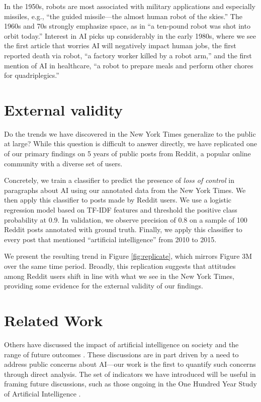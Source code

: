 \documentclass[letterpaper]{article}
\begin{document}
In the 1950s, robots are most associated with military applications and especially missiles, e.g., ``the guided missile---the almost human robot of the skies.'' The 1960s and 70s strongly emphasize space, as in ``a ten-pound robot was shot into orbit today.'' Interest in AI picks up considerably in the early 1980s, where we see the first article that worries AI will negatively impact human jobs, the first reported death via robot, ``a factory worker killed by a robot arm,'' and the first mention of AI in healthcare, ``a robot to prepare meals and perform other chores for quadriplegics.''

\vspace{-1.18mm}
\vspace{-1.99mm}
\section{External validity}

\vspace{-0.76mm}
Do the trends we have discovered in the New York Times generalize to the public at large? While this question is difficult to answer directly, we have replicated one of our primary findings on 5 years of public posts from Reddit, a popular online community with a diverse set of users.

Concretely, we train a classifier to predict the presence of \textit{loss of control} in paragraphs about AI using our annotated data from the New York Times. We then apply this classifier to posts made by Reddit users. We use a logistic regression model based on TF-IDF features and threshold the positive class probability at 0.9. In validation, we observe precision of 0.8 on a sample of 100 Reddit posts annotated with ground truth. Finally, we apply this classifier to every post that mentioned ``artificial intelligence'' from 2010 to 2015.

We present the resulting trend in Figure \ref{fig:replicate}, which mirrors Figure 3M over the same time period. Broadly, this replication suggests that attitudes among Reddit users shift in line with what we see in the New York Times, providing some evidence for the external validity of our findings.

\section{Related Work}

Others have discussed the impact of artificial intelligence on society and the range of future outcomes \cite{ai-concerns}. These discussions are in part driven by a need to address public concerns about AI---our work is the first to quantify such concerns through direct analysis. The set of indicators we have introduced will be useful in framing future discussions, such as those ongoing in the One Hundred Year Study of Artificial Intelligence \cite{100years}.
\end{document}
